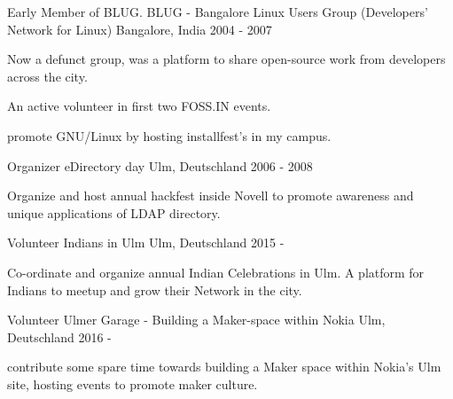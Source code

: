 

\begin{cventries}

  \cventry
    {Early Member of BLUG.} %
    {BLUG - Bangalore Linux Users Group (Developers’ Network for Linux)} %
    {Bangalore, India} %
    {2004 - 2007} %
    {
      \begin{cvitems} %
       \item {Now a defunct group, was a platform to share open-source work from developers across the city.}
       \item {An active volunteer in first two FOSS.IN events.}
       \item {promote GNU/Linux by hosting installfest's in my campus.}
      \end{cvitems}
    }

	\cventry
    {Organizer} %
    {eDirectory day} %
    {Ulm, Deutschland} %
    {2006 - 2008} %
    {
    	  \begin{cvitems}
    	    \item {Organize and host annual hackfest inside Novell to promote awareness and unique applications of LDAP directory.}
    	  \end{cvitems}
    }


	\cventry
    {Volunteer} %
    {Indians in Ulm } %
    {Ulm, Deutschland} %
    {2015 - } %
    {
    	  \begin{cvitems}
    	    \item {Co-ordinate and organize annual Indian Celebrations in Ulm. A platform for Indians to meetup and grow their Network in the city.}
    	  \end{cvitems}
    }

	\cventry
    {Volunteer} %
    {Ulmer Garage - Building a Maker-space within Nokia} %
    {Ulm, Deutschland} %
    {2016 - } %
    {
    	  \begin{cvitems}
    	    \item {contribute some spare time towards building a Maker space within Nokia's Ulm site, hosting events to promote maker culture.}
    	  \end{cvitems}
    }

\end{cventries}

